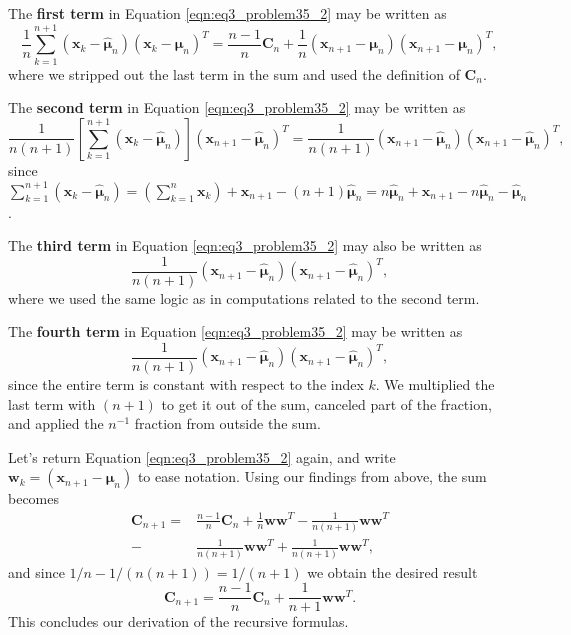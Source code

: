 \documentclass[12pt, a4paper]{article}
\newcommand{\vect}[1]{\bm{#1}}
\begin{document}
\begin{easylist}[enumerate]
	The \textbf{first term} in Equation \eqref{eqn:eq3_problem35_2} may be written as
	\begin{equation*}
	\frac{1}{n} \sum_{k=1}^{n+1}  \left( \vect{x}_k  - \hat{\vect{\mu}}_n \right)\left( \vect{x}_k  - \hat{\vect{\mu}}_n \right)^T = \frac{n-1}{n} \vect{C}_n  
	+ \frac{1}{n} \left( \vect{x}_{n+1} - \vect{\mu}_n \right) 
	\left( \vect{x}_{n+1} - \vect{\mu}_n \right)^T,
	\end{equation*}
	where we stripped out the last term in the sum and used the definition of $\vect{C}_n$.
	
	
	The \textbf{second term} in Equation \eqref{eqn:eq3_problem35_2} may be written as
	\begin{equation*}
	\frac{1}{n(n+1)} \left[ \sum_{k=1}^{n+1}  \left( \vect{x}_{k}  - \hat{\vect{\mu}}_n \right)\right]\left( \vect{x}_{n+1} - \hat{\vect{\mu}}_n \right)^T
	= 
	\frac{1}{n(n+1)}  
	\left( \vect{x}_{n+1} - \hat{\vect{\mu}}_n \right)
	\left( \vect{x}_{n+1} - \hat{\vect{\mu}}_n \right)^T,
	\end{equation*}
	since $\sum_{k=1}^{n+1}  \left( \vect{x}_{k}  - \hat{\vect{\mu}}_n \right)
	= \left( \sum_{k=1}^{n} \vect{x}_{k} \right) + \vect{x}_{n+1} - (n+1)\hat{\vect{\mu}}_n = n\hat{\vect{\mu}}_n + \vect{x}_{n+1} - n\hat{\vect{\mu}}_n - \hat{\vect{\mu}}_n$.
	
	The \textbf{third term} in Equation \eqref{eqn:eq3_problem35_2} may also be written as
	\begin{equation*}
	\frac{1}{n(n+1)}  
	\left( \vect{x}_{n+1} - \hat{\vect{\mu}}_n \right)
	\left( \vect{x}_{n+1} - \hat{\vect{\mu}}_n \right)^T,
	\end{equation*}
	where we used the same logic as in computations related to the second term.
	
	The \textbf{fourth term} in Equation \eqref{eqn:eq3_problem35_2} may be written as
	\begin{equation*}
	\frac{1}{n(n+1)}  
	\left( \vect{x}_{n+1} - \hat{\vect{\mu}}_n \right)
	\left( \vect{x}_{n+1} - \hat{\vect{\mu}}_n \right)^T,
	\end{equation*}
	since the entire term is constant with respect to the index $k$.
	We multiplied the last term with $(n+1)$ to get it out of the sum, canceled part of the fraction, and applied the $n^{-1}$ fraction from outside the sum.
	
	Let's return Equation \eqref{eqn:eq3_problem35_2} again, and write $\vect{w}_k = \left( \vect{x}_{n+1} - \hat{\vect{\mu}}_n \right)$ to ease notation.
	Using our findings from above, the sum becomes
	\begin{align*}
	\vect{C}_{n+1} = & \frac{n-1}{n} \vect{C}_n +  \frac{1}{n} \vect{w} \vect{w}^T -  \frac{1}{n(n+1)} \vect{w} \vect{w}^T \\
	- &  \frac{1}{n(n+1)} \vect{w} \vect{w}^T + \frac{1}{n(n+1)} \vect{w} \vect{w}^T,
	\end{align*}
	and since $1/n - 1/(n (n+1)) = 1 / ( n + 1 )$ we obtain the desired result
	\begin{equation*}
	\vect{C}_{n+1} = \frac{n-1}{n} \vect{C}_n + \frac{1}{n+1} \vect{w} \vect{w}^T.
	\end{equation*}
	This concludes our derivation of the recursive formulas.
	

\end{easylist}
\end{document}
